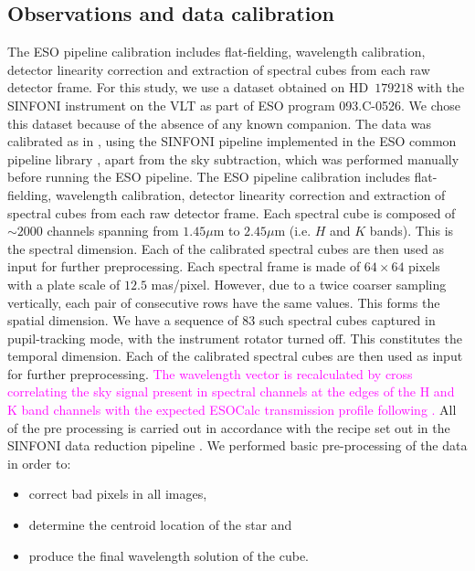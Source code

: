 \documentclass[referee]{aa} %
\newcommand{\newchange}[1]{\textcolor{magenta}{#1}}
\begin{document}
\subsection{Observations and data calibration}\label{sec:datadesc}
The ESO pipeline calibration includes flat-fielding, wavelength calibration, detector linearity correction and extraction of spectral cubes from each raw detector frame. 
For this study, we use a dataset obtained on HD~$179218$ with the SINFONI instrument on the VLT \citep{2004SINFONI,2003SEisenhauer} as part of ESO program 093.C-0526.
We chose this dataset because of the absence of any known companion.
The data was calibrated as in \citet{2018A&ChristiaensHD142527}, using the SINFONI pipeline implemented in the ESO common pipeline library \citep[EsoRex version 3.10.2;][]{2006Abuter}, apart from the sky subtraction, which was performed manually before running the ESO pipeline.
The ESO pipeline calibration includes flat-fielding, wavelength calibration, detector linearity correction and extraction of spectral cubes from each raw detector frame. 
Each spectral cube is composed of $\sim 2000$ channels spanning from $1.45\mu$m to $2.45 \mu$m (i.e. $H$ and $K$ bands).
This is the spectral dimension.
Each of the calibrated spectral cubes are then used as input for further preprocessing.
Each spectral frame is made of $64\times64$ pixels with a plate scale of $12.5$ mas/pixel. However, due to a twice coarser sampling vertically, each pair of consecutive rows have the same values.
This forms the spatial dimension.
We have a sequence of $83$ such spectral cubes captured in pupil-tracking mode, with the instrument rotator turned off.
This constitutes the temporal dimension.
Each of the calibrated spectral cubes are then used as input for further preprocessing.
\newchange{The wavelength vector is recalculated by cross correlating the sky signal present in spectral channels at the edges of the H and K band channels with the expected ESOCalc transmission profile following \cite{2018AHoeijmakersMM}. }
All of the pre processing is carried out in accordance with the recipe set out in the SINFONI data reduction pipeline \citep{2006Abuter}.
We performed basic pre-processing of the data in order to:
\begin{itemize}
    \item correct bad pixels in all images,
    \item determine the centroid location of the star and
    \item produce the final wavelength solution of the cube. 
\end{itemize}
\end{document}
